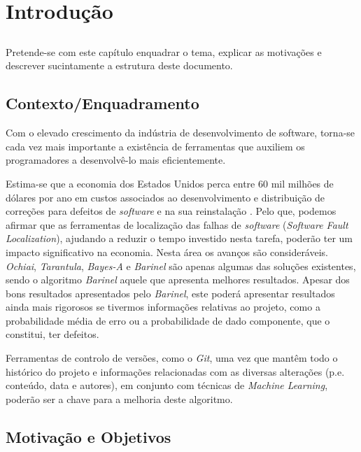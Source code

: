 \chapter{Introdução} \label{chap:intro}

\section*{}

Pretende-se com este capítulo enquadrar o tema, explicar as motivações e descrever sucintamente a estrutura deste documento.

\section{Contexto/Enquadramento} \label{sec:context}

Com o elevado crescimento da indústria de desenvolvimento de software,
torna-se cada vez mais importante a existência de ferramentas que auxiliem
os programadores a desenvolvê-lo mais eficientemente.

Estima-se que a economia dos Estados Unidos perca entre 60 mil milhões de dólares por ano em custos associados ao desenvolvimento e distribuição de correções para defeitos de \emph{software} e na sua reinstalação \cite{Zhivich2009}. Pelo que, podemos afirmar que as ferramentas de localização das falhas de \emph{software} (\emph{Software Fault Localization}), ajudando a reduzir o tempo investido nesta tarefa, poderão ter um impacto significativo na economia.
Nesta área os avanços são consideráveis. \emph{Ochiai}, \emph{Tarantula}, \emph{Bayes-A} e \emph{Barinel} são apenas algumas das soluções existentes, sendo o algoritmo \emph{Barinel} aquele que apresenta melhores resultados. \cite{Abreu2009}
Apesar dos bons resultados apresentados pelo \emph{Barinel}, este poderá apresentar resultados ainda mais rigorosos se tivermos informações relativas ao projeto, como a probabilidade média de erro ou a probabilidade de dado componente, que o constitui, ter defeitos.

Ferramentas de controlo de versões, como o \emph{Git}, uma vez que mantêm todo o histórico do projeto e informações relacionadas com as diversas alterações (p.e. conteúdo, data e autores), em conjunto com técnicas de \emph{Machine Learning}, poderão ser a chave para a melhoria deste algoritmo.

\section{Motivação e Objetivos} \label{sec:goals}


